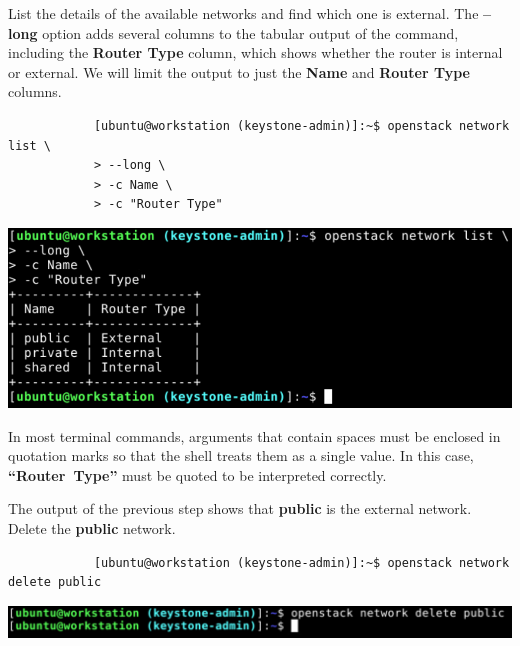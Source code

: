 \documentclass[letterpaper, 12pt]{article}
\begin{document}
\begin{enumerate}
    \begin{labstep}
        List the details of the available networks and find which one is external.
        The \textbf{--long} option adds several columns to the tabular output of the command, including the \textbf{Router Type} column, which shows whether the router is internal or external.
        We will limit the output to just the \textbf{Name} and \textbf{Router Type} columns.
        \begin{lstlisting}
            [ubuntu@workstation (keystone-admin)]:~$ openstack network list \
            > --long \
            > -c Name \
            > -c "Router Type"
        \end{lstlisting}

        \begin{center}
            \includegraphics[width=\linewidth]{images/part1/step11.png}
        \end{center}
    \end{labstep}

    \begin{tipbox}
        In most terminal commands, arguments that contain spaces must be enclosed in quotation marks so that the shell treats them as a single value.
        In this case, \textbf{``Router~Type''} must be quoted to be interpreted correctly.
    \end{tipbox}

    \begin{labstep}
        The output of the previous step shows that \textbf{public} is the external network.
        Delete the \textbf{public} network.
        \begin{lstlisting}
            [ubuntu@workstation (keystone-admin)]:~$ openstack network delete public
        \end{lstlisting}

        \begin{center}
            \includegraphics[width=\linewidth]{images/part1/step12.png}
        \end{center}
    \end{labstep}


\end{enumerate}
\end{document}
